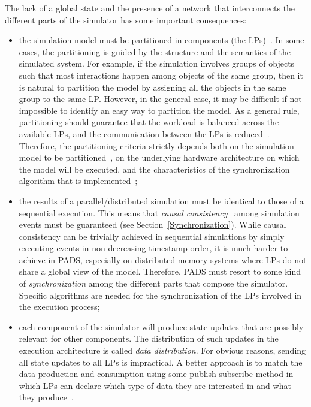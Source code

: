 \documentclass[1p]{elsarticle}
\begin{document}
The lack of a global state and the presence of a network that
interconnects the different parts of the simulator has some important
consequences:

\begin{itemize}

\item the simulation model must be partitioned in components (the
  LPs)~\cite{bagrodia98}. In some cases, the partitioning is guided by
  the structure and the semantics of the simulated system. For
  example, if the simulation involves groups of objects such that most
  interactions happen among objects of the same group, then it is
  natural to partition the model by assigning all the objects in the
  same group to the same LP.  However, in the general case, it may be
  difficult if not impossible to identify an easy way to partition the
  model. As a general rule, partitioning should guarantee that the
  workload is balanced across the available LPs, and the communication
  between the LPs is
  reduced~\cite{5356113,761559,4262808,gda-ijspm-2009}.  Therefore,
  the partitioning criteria strictly depends both on the simulation
  model to be partitioned~\cite{685269}, on the underlying hardware
  architecture on which the model will be executed, and the
  characteristics of the synchronization algorithm that is
  implemented~\cite{Boukerche:1997:DLB:268826.268897};

\item the results of a parallel/distributed simulation must be
  identical to those of a sequential execution. This means that
  \emph{causal consistency}~\cite{Lamport1978,FUJ00} among simulation
  events must be guaranteed (see Section~\ref{Synchronization}).
  While causal consistency can be trivially achieved in sequential
  simulations by simply executing events in non-decreasing timestamp
  order, it is much harder to achieve in PADS, especially on
  distributed-memory systems where LPs do not share a global view of
  the model. Therefore, PADS must resort to some kind of
  \emph{synchronization} among the different parts that compose the
  simulator. Specific algorithms are needed for the synchronization of
  the LPs involved in the execution process;

\item each component of the simulator will produce state updates that
  are possibly relevant for other components. The distribution of such
  updates in the execution architecture is called \emph{data
    distribution}. For obvious reasons, sending all state updates to
  all LPs is impractical. A better approach is to match the data
  production and consumption using some publish-subscribe method in
  which LPs can declare which type of data they are interested in and
  what they produce~\cite{Jun:2002:ESM:564062.564074}.

\end{itemize}
\end{document}
